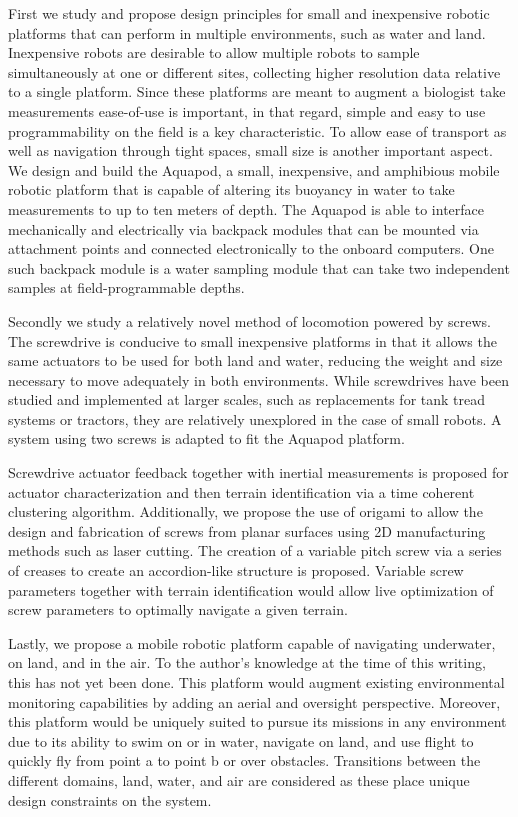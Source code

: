 First we study and propose design principles for small and inexpensive robotic platforms that can perform in multiple environments, such as water and land. Inexpensive robots are desirable to allow multiple robots to sample simultaneously at one or different sites, collecting higher resolution data relative to a single platform. Since these platforms are meant to augment a biologist take measurements ease-of-use is important, in that regard, simple and easy to use programmability on the field is a key characteristic. To allow ease of transport as well as navigation through tight spaces, small size is another important aspect. We design and build the Aquapod, a small, inexpensive, and amphibious mobile robotic platform that is capable of altering its buoyancy in water to take measurements to up to ten meters of depth. The Aquapod is able to interface mechanically and electrically via backpack modules that can be mounted via attachment points and connected electronically to the onboard computers. One such backpack module is a water sampling module that can take two independent samples at field-programmable depths. 

Secondly we study a relatively novel method of locomotion powered by screws. The screwdrive is conducive to small inexpensive platforms in that it allows the same actuators to be used for both land and water, reducing the weight and size necessary to move adequately in both environments. While screwdrives have been studied and implemented at larger scales, such as replacements for tank tread systems or tractors, they are relatively unexplored in the case of small robots. A system using two screws is adapted to fit the Aquapod platform. 

Screwdrive actuator feedback together with inertial measurements is proposed for actuator characterization and then terrain identification via a time coherent clustering algorithm. Additionally, we propose the use of origami to allow the design and fabrication of screws from planar surfaces using 2D manufacturing methods such as laser cutting. The creation of a variable pitch screw via a series of creases to create an accordion-like structure is proposed. Variable screw parameters together with terrain identification would allow live optimization of screw parameters to optimally navigate a given terrain. 

Lastly, we propose a mobile robotic platform capable of navigating underwater, on land, and in the air. To the author's knowledge at the time of this writing, this has not yet been done. This platform would augment existing environmental monitoring capabilities by adding an aerial and oversight perspective. Moreover, this platform would be uniquely suited to pursue its missions in any environment due to its ability to swim on or in water, navigate on land, and use flight to quickly fly from point a to point b or over obstacles. Transitions between the different domains, land, water, and air are considered as these place unique design constraints on the system. 






